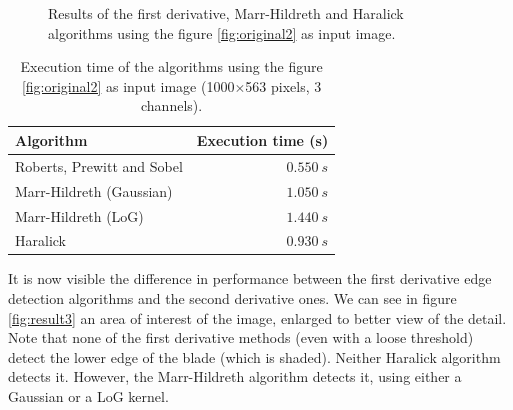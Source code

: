 \documentclass{ipol}
\numberwithin{equation}{section}
\numberwithin{table}{section}
\numberwithin{figure}{section}
\begin{document}
\begin{figure}[h!]
	\quad
	\caption{Results of the first derivative, Marr-Hildreth and Haralick algorithms using the figure \ref{fig:original2} as input image.}
	\label{fig:result2}
\end{figure}

\begin{table}[h!]
	\begin{center}
	\begin{tabular}{| l | r |}
		\hline \rule{0pt}{3ex}
		\cellcolor[gray]{0.8} \textbf{Algorithm}	& \cellcolor[gray]{0.8} \textbf{Execution time (s)}	\\ \hline \rule{0pt}{3ex}
		Roberts, Prewitt and Sobel					& $0.550 \ s$										\\ \hline \rule{0pt}{3ex}
		Marr-Hildreth (Gaussian)					& $1.050 \ s$										\\ \hline \rule{0pt}{3ex}
		Marr-Hildreth (LoG)							& $1.440 \ s$										\\ \hline \rule{0pt}{3ex}
		Haralick									& $0.930 \ s$										\\
		\hline
	\end{tabular}
	\end{center}
	\caption{Execution time of the algorithms using the figure \ref{fig:original2} as input image (1000$\times$563 pixels, 3 channels).}
	\label{exectime2}
\end{table}
\vspace{0.5cm}

It is now visible the difference in performance between the first derivative edge detection algorithms and the second derivative ones. We can see in figure \ref{fig:result3} an area of ​​interest of the image, enlarged to better view of the detail. Note that none of the first derivative methods (even with a loose threshold) detect the lower edge of the blade (which is shaded). Neither Haralick algorithm detects it. However, the Marr-Hildreth algorithm detects it, using either a Gaussian or a LoG kernel. \\
\end{document}
